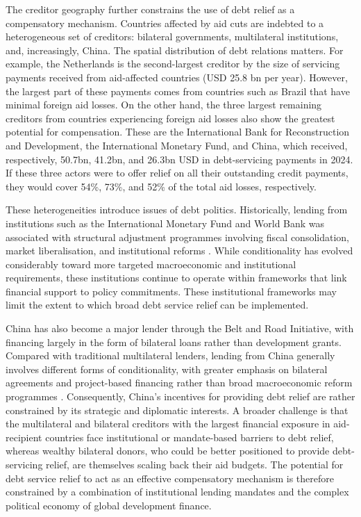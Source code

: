 \documentclass[fleqn,10pt,twocolumn]{wlscirep}
\begin{document}
{%
The creditor geography further constrains the use of debt relief as a compensatory mechanism. Countries affected by aid cuts are indebted to a heterogeneous set of creditors: bilateral governments, multilateral institutions, and, increasingly, China. The spatial distribution of debt relations matters. For example, the Netherlands is the second-largest creditor by the size of servicing payments received from aid-affected countries (USD 25.8 bn per year). However, the largest part of these payments comes from countries such as Brazil that have minimal foreign aid losses. On the other hand, the three largest remaining creditors from countries experiencing foreign aid losses also show the greatest potential for compensation. These are the International Bank for Reconstruction and Development, the International Monetary Fund, and China, which received, respectively, 50.7bn, 41.2bn, and 26.3bn USD in debt-servicing payments in 2024. If these three actors were to offer relief on all their outstanding credit payments, they would cover 54\%, 73\%, and 52\% of the total aid losses, respectively. 

These heterogeneities introduce issues of debt politics. Historically, lending from institutions such as the International Monetary Fund and World Bank was associated with structural adjustment programmes involving fiscal consolidation, market liberalisation, and institutional reforms \cite{dreher2009imf, kentikelenis2016imf}. While conditionality has evolved considerably toward more targeted macroeconomic and institutional requirements, these institutions continue to operate within frameworks that link financial support to policy commitments. These institutional frameworks may limit the extent to which broad debt service relief can be implemented. 

China has also become a major lender through the Belt and Road Initiative, with financing largely in the form of bilateral loans rather than development grants. Compared with traditional multilateral lenders, lending from China generally involves different forms of conditionality, with greater emphasis on bilateral agreements and project-based financing rather than broad macroeconomic reform programmes \cite{himmer2022chinese, watkins2022undermining}. Consequently, China's incentives for providing debt relief are rather constrained by its strategic and diplomatic interests. A broader challenge is that the multilateral and bilateral creditors with the largest financial exposure in aid-recipient countries face institutional or mandate-based barriers to debt relief, whereas wealthy bilateral donors, who could be better positioned to provide debt-servicing relief, are themselves scaling back their aid budgets. The potential for debt service relief to act as an effective compensatory mechanism is therefore constrained by a combination of institutional lending mandates and the complex political economy of global development finance.
}
\end{document}
